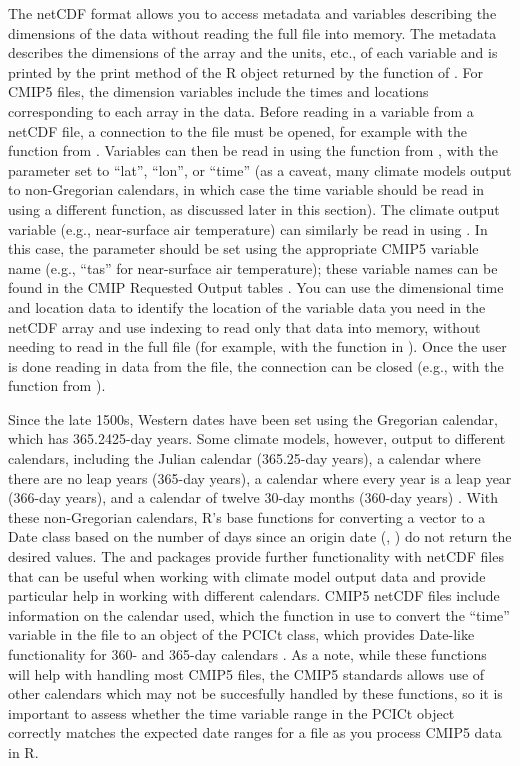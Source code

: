 The netCDF format allows you to access metadata and variables describing
the dimensions of the data without reading the full file into memory.
The metadata describes the dimensions of the array and the units, etc.,
of each variable and is printed by the print method of the R object
returned by the  function of . For CMIP5
files, the dimension variables include the times and locations
corresponding to each array in the data. Before reading in a variable
from a netCDF file, a connection to the file must be opened, for example
with the  function from . Variables can then
be read in using the  function from , with
the  parameter set to ``lat'', ``lon'', or ``time'' (as a
caveat, many climate models output to non-Gregorian calendars, in which
case the time variable should be read in using a different function, as
discussed later in this section). The climate output variable (e.g.,
near-surface air temperature) can similarly be read in using
. In this case, the  parameter should be
set using the appropriate CMIP5 variable name (e.g., ``tas'' for
near-surface air temperature); these variable names can be found in the
CMIP Requested Output tables \citep{taylor2010cmip5}. You can use the
dimensional time and location data to identify the location of the
variable data you need in the netCDF array and use indexing to read only
that data into memory, without needing to read in the full file (for
example, with the  function in
). Once the user is done reading in data from the
file, the connection can be closed (e.g., with the 
function from ).

Since the late 1500s, Western dates have been set using the Gregorian
calendar, which has 365.2425-day years. Some climate models, however,
output to different calendars, including the Julian calendar (365.25-day
years), a calendar where there are no leap years (365-day years), a
calendar where every year is a leap year (366-day years), and a calendar
of twelve 30-day months (360-day years) \citep{cfconventions}. With
these non-Gregorian calendars, R's base functions for converting a
vector to a Date class based on the number of days since an origin date
(, ) do not return the desired values.
The  \citep{PCICt} and 
\citep{ncdf4.helpers} packages provide further functionality with netCDF
files that can be useful when working with climate model output data and
provide particular help in working with different calendars. CMIP5
netCDF files include information on the calendar used, which the
 function in  use to convert
the ``time'' variable in the file to an object of the PCICt class, which
provides Date-like functionality for 360- and 365-day calendars
\citep{PCICt}. As a note, while these functions will help with handling
most CMIP5 files, the CMIP5 standards allows use of other calendars
which may not be succesfully handled by these functions, so it is
important to assess whether the time variable range in the PCICt object
correctly matches the expected date ranges for a file as you process
CMIP5 data in R.

